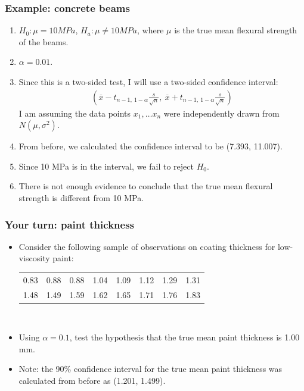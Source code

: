 \documentclass[handout]{beamer}\usepackage{graphicx, color}
\providecommand{\ov}[1]{\overline{#1}}
\providecommand{\q}{$\quad$ \newline}
\numberwithin{equation}{section}
\begin{document}
\begin{frame}
\frametitle{Example: concrete beams} \small
\begin{enumerate}[1. ]
\item $H_0: \mu = 10 MPa$, $H_a: \mu \ne 10 MPa$, where $\mu$ is the true mean flexural strength of the beams. 
\pause \item $\alpha = 0.01$.
\pause \item Since this is a two-sided test, I will use a two-sided confidence interval:
\pause \begin{align*}
\left (\ov{x} - t_{n - 1 , \ 1 - \alpha} \frac{s}{\sqrt{n}}, \ \ov{x} + t_{n - 1 , \ 1 - \alpha} \frac{s}{\sqrt{n}} \right )
\end{align*}
\pause I am assuming the data points $x_1, \ldots x_n$ were independently drawn from $N(\mu, \sigma^2)$.
\pause \item From before, we calculated the confidence interval to be (7.393, 11.007).
\pause \item Since 10 MPa is in the interval, we fail to reject $H_0$.
\pause \item There is not enough evidence to conclude that the true mean flexural strength is different from 10 MPa. 
\end{enumerate}
\end{frame}



\begin{frame}
\frametitle{Your turn: paint thickness}
\begin{itemize}
\item Consider the following sample of observations on coating thickness for low-viscosity paint: 
\pause \begin{tabular}{cccccccc}
0.83 & 0.88 & 0.88 & 1.04 & 1.09 & 1.12 & 1.29 & 1.31 \\
1.48 & 1.49 & 1.59 & 1.62 & 1.65 & 1.71 & 1.76 & 1.83
\end{tabular} \q
\pause \item Using $\alpha = 0.1$, test the hypothesis that the true mean paint thickness is 1.00 mm.
\pause \item Note: the 90\% confidence interval for the true mean paint thickness was calculated from before as  (1.201, 1.499).
\end{itemize}
\end{frame}
\end{document}
